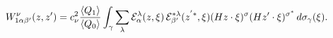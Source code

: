 \begin{equation*}
W^\nu _{1\alpha \beta'}(z,z')= c_\nu^{2}\frac{\langle Q_{1}
\rangle}{\langle Q_{0} \rangle}\int_\gamma \sum_{\lambda}{\cal
E}^{\lambda}_{\alpha }(z,\xi) \,{\cal
E}^{*\lambda}_{\beta'}(z^{'*},\xi) (Hz\cdot\xi)^{\sigma}(H z'\cdot
\xi)^{\sigma^{*}}\,d\sigma_\gamma(\xi).
\end{equation*}

